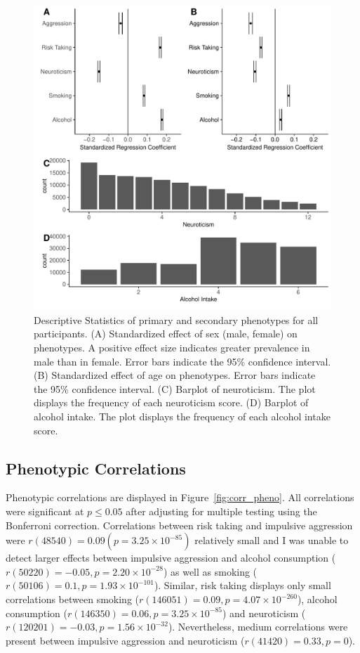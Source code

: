 \begin{figure}[htpb]
  \centering
  \includegraphics[width=0.8\linewidth]{ukb_assoc/figure/phenotype/descriptives_plots.pdf}
  \caption[Descriptive Statistics of Primary and Secondary Phenotypes]{
    Descriptive Statistics of primary and secondary phenotypes for all participants.
    (A) Standardized effect of sex (male, female) on phenotypes. 
    A positive effect size indicates greater prevalence in male than in female.
    Error bars indicate the 95\% confidence interval.
    (B) Standardized effect of age on phenotypes.
    Error bars indicate the 95\% confidence interval.
    (C) Barplot of neuroticism.
    The plot displays the frequency of each neuroticism score.
    (D) Barplot of alcohol intake.
    The plot displays the frequency of each alcohol intake score.
  }\label{fig:disc}
\end{figure}

\subsection{Phenotypic Correlations}
\label{sub:phenotype_correlations}

Phenotypic correlations are displayed in Figure~\ref{fig:corr_pheno}. 
All correlations were significant at $p\leq 0.05$ after adjusting for multiple testing using the Bonferroni correction.
Correlations between risk taking and impulsive aggression were $r(48540)=0.09 (p=3.25\times 10^{-85})$ relatively small
and I was unable to detect larger effects between impulsive aggression and alcohol consumption ($r(50220)=-0.05, p=2.20\times 10^{-28}$)
as well as smoking ($r(50106)=0.1, p=1.93\times 10^{-101}$).
Similar, risk taking displays only small correlations between
smoking ($r(146051)=0.09, p=4.07\times 10^{-260}$),
alcohol consumption ($r(146350)=0.06, p=3.25\times 10^{-85}$)
and neuroticism ($r(120201)=-0.03, p=1.56\times 10^{-32}$). 
Nevertheless, medium correlations were present between impulsive aggression and neuroticism ($r(41420)=0.33, p=0$).

